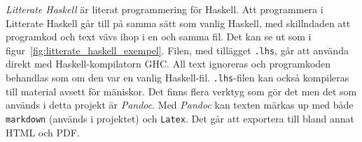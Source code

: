 \begin{draft}
\textit{Litterate Haskell} är literat programmering för Haskell.\cite{litterate_haskell}
Att programmera i Litterate Haskell går till på samma sätt som vanlig Haskell,
med skillndaden att programkod och text vävs ihop i en och samma fil. Det kan
se ut som i figur~\ref{fig:litterate_haskell_exempel}. Filen, med tillägget
\texttt{.lhs}, går att använda direkt med Haskell-kompilatorn GHC. All text
ignoreras och programkoden behandlas som om den var en vanlig
Haskell-fil. \texttt{.lhs}-filen kan också kompileras till material avsett för
mäniskor. Det finns flera verktyg som gör det men det som används i detta
projekt är \textit{Pandoc}\cite{pandoc}. Med \textit{Pandoc} kan texten märkas
up med både \texttt{markdown} (används i projektet) och \texttt{Latex}. Det går
att exportera till bland annat HTML och PDF.
\end{draft}

